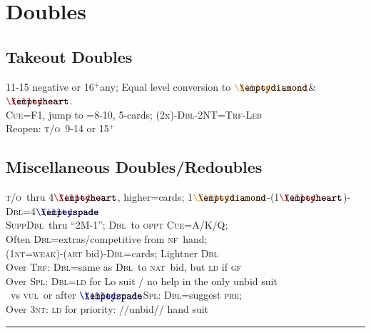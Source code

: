 \documentclass{article}
\newcommand\coloredsuitsymbol[3]{\ensuremath{\mathrel{\raisebox{-0.3pt}{{\color{#1}#2}\llap{#3}}}}}
\newcommand\suitsymbol[3]{\coloredsuitsymbol{#1}{#2}{#3}}%
\newcommand\D{\suitsymbol{diamondcolor}{\filleddiamond}{\emptydiamond}}
\renewcommand\H{\suitsymbol{heartcolor}{\filledheart}{\emptyheart}}
\renewcommand\S{\suitsymbol{spadecolor}{\filledspade}{\emptyspade}}
\newcommand\N{\caps{nt}}
\newcommand\X{\caps{Dbl}}
\newcommand\caps[1]{{\scshape#1}}
\newcommand\GF{\caps{gf}}
\newcommand\NF{\caps{nf}}
\newcommand\VUL{\caps{vul}}
\newcommand\NV{\caps{nv}}
\newcommand\TRF{\caps{Trf}}
\newcommand\NAT{\caps{nat}}
\newcommand\takeout{\caps{t/o}}
\newcommand\CUE{\caps{Cue}}
\newcommand\more{\ensuremath{^+}}
\newcommand{\smallsection}[1]{\vspace{-1ex}\subsection*{#1}\raggedright}
\newcommand{\thinrule}{\rule{\textwidth}{\arrayrulewidth}}
\newcommand{\myendrule}{\vspace{-1.5ex}\thinrule}
\begin{document}
\begin{minipage}[t]{90mm}
\section*{Doubles}
\smallsection{Takeout Doubles} 
	11-15 negative or 16\more any; Equal level conversion to \D \& \H.\\
	\CUE=F1, jump to =8-10, 5-cards; (2x)-\X-2NT=\caps{Trf-Leb}\\
	Reopen: \takeout\ 9-14 or 15\more
\smallsection{Miscellaneous Doubles/Redoubles}
	\takeout\ thru 4\H, higher=cards; 1\D-(1\H)-\X=4\S\\
	\caps{Supp}\X\ thru ``2M-1''; \X\ to \caps{oppt} \CUE=A/K/Q;\\ 
	Often \X=extras/competitive from \NF\ hand;\\
	(1\N=\caps{weak})-(\caps{art} bid)-\X=cards;  Lightner \X\\
	Over \TRF: \X=same as \X\ to \NAT\ bid, but \caps{ld} if \GF\\
	Over \caps{Spl}: \X=\caps{ld} for Lo suit / no help in the only unbid suit\\
	\quad \NV\ vs \VUL\ or after \S\caps{Spl}: \X=suggest \caps{pre}; \\
	Over 3\N: \caps{ld} for  priority: //unbid// hand suit\\
\myendrule
\end{minipage}
\hfill
\end{document}

